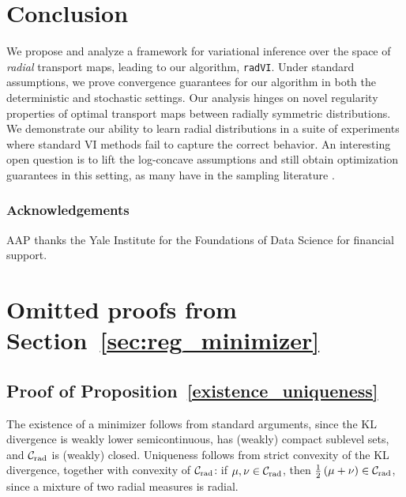 \documentclass[twoside]{article}
\newcommand{\cC}{\mathcal{C}}
\newcommand{\1}{\mathds{1}}
\newcommand{\Crad}{\cC_{\rm rad}}
\theoremstyle{plain}
\theoremstyle{definition}
\theoremstyle{remark}
\begin{document}
\section{Conclusion}
We propose and analyze a framework for variational inference over the space of \emph{radial} transport maps, leading to our algorithm, \texttt{radVI}. Under standard assumptions, we prove convergence guarantees for our algorithm in both the deterministic and stochastic settings. Our analysis hinges on novel regularity properties of optimal transport maps between radially symmetric distributions. We demonstrate our ability to learn radial distributions in a suite of experiments where standard VI methods fail to capture the correct behavior. An interesting open question is to lift the log-concave assumptions and still obtain optimization guarantees in this setting, as many have in the sampling literature \citep{balasubramanian2022towards, ChewiBook}.

\subsubsection*{Acknowledgements}
AAP thanks the Yale Institute for the Foundations of Data Science for financial support.



\appendix
\onecolumn
\section{Omitted proofs from Section~\ref{sec:reg_minimizer}}\label{app:reg_minimizer}

\subsection{Proof of Proposition~\ref{existence_uniqueness}}

{The existence of a minimizer follows from standard arguments, since the KL divergence is weakly lower semicontinuous, has (weakly) compact sublevel sets, and $\Crad$ is (weakly) closed.} {Uniqueness follows from strict convexity of the KL divergence, together with convexity of $\Crad$: if $\mu,\nu \in \Crad$, then $\frac{1}{2}\,(\mu+\nu) \in \Crad$, since a mixture of two radial measures is radial.}
\end{document}
